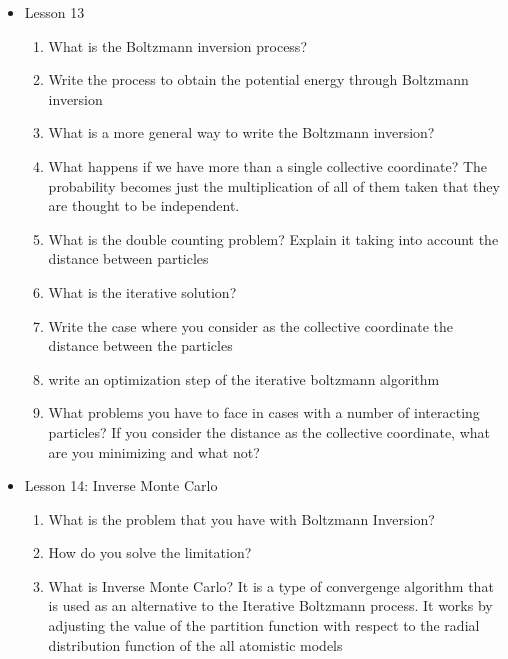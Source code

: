 {\begin{itemize}
\begin{enumerate}
        \item What formula of relative entropy do you obtain that should be minimized? (Gibbs-Bogoliubov inequality)
        \item What is the condition that is satisfied when you are at the minimum of the relative entropy? See the signed element
        \item What is also conserved in case in which the relative entropy is at the minimum? The radial distribution functions computed for the coarse grained and the all atom system.
        \item Make the straightforward conclusion.
    \end{enumerate}
    \item Lesson 13
    \begin{enumerate}
        \item What is the Boltzmann inversion process?
        \item Write the process to obtain the potential energy through Boltzmann inversion
        \item What is a more general way to write the Boltzmann inversion?
        \item What happens if we have more  than a single collective coordinate? The probability becomes just the multiplication of all of them taken that they are thought to be independent.
        \item What is the double counting problem? Explain it taking into account the distance between particles
        \item What is the iterative solution?
        \item Write the case where you consider as the collective coordinate the distance between the particles
        \item write an optimization step of the iterative boltzmann algorithm
        \item What problems you have to face in cases with a number of interacting particles? If you consider the distance as the collective coordinate, what are you minimizing and what not?
    \end{enumerate}
    \item Lesson 14: Inverse Monte Carlo
    \begin{enumerate}
        \item What is the problem that you have with Boltzmann Inversion?
        \item How do you solve the limitation?
        \item What is Inverse Monte Carlo? It is a type of convergenge algorithm that is used as an alternative to the Iterative Boltzmann process. It works by adjusting the value of the partition function with respect to the radial distribution function of the all atomistic models

\end{enumerate}
\end{itemize}}
